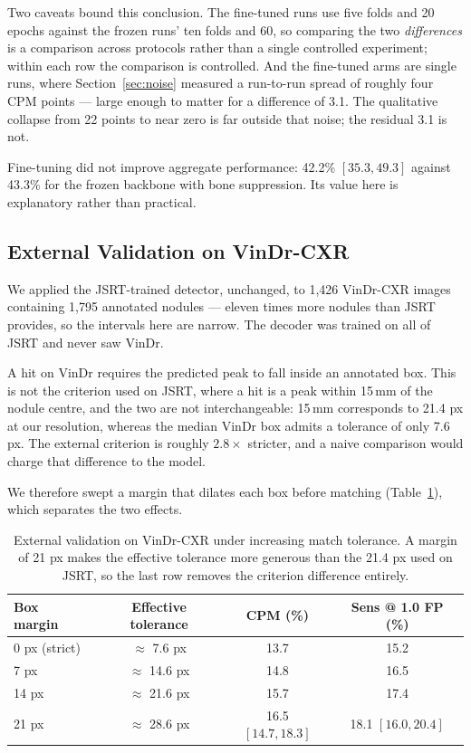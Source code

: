 \documentclass[11pt,a4paper]{article}
\begin{document}
Two caveats bound this conclusion. The fine-tuned runs use five folds and 20
epochs against the frozen runs' ten folds and 60, so comparing the two
\emph{differences} is a comparison across protocols rather than a single
controlled experiment; within each row the comparison is controlled. And the
fine-tuned arms are single runs, where Section~\ref{sec:noise} measured a
run-to-run spread of roughly four CPM points --- large enough to matter for a
difference of 3.1. The qualitative collapse from 22 points to near zero is far
outside that noise; the residual 3.1 is not.

Fine-tuning did not improve aggregate performance: 42.2\% $[35.3, 49.3]$ against
43.3\% for the frozen backbone with bone suppression. Its value here is
explanatory rather than practical.

\subsection{External Validation on VinDr-CXR}
\label{sec:external}

We applied the JSRT-trained detector, unchanged, to 1{,}426 VinDr-CXR
images~\cite{nguyen2022vindr} containing 1{,}795 annotated nodules --- eleven
times more nodules than JSRT provides, so the intervals here are narrow. The
decoder was trained on all of JSRT and never saw VinDr.

A hit on VinDr requires the predicted peak to fall inside an annotated box.
This is not the criterion used on JSRT, where a hit is a peak within 15\,mm of
the nodule centre, and the two are not interchangeable: 15\,mm corresponds to
21.4 px at our resolution, whereas the median VinDr box admits a tolerance of
only 7.6 px. The external criterion is roughly $2.8\times$ stricter, and a naive
comparison would charge that difference to the model.

We therefore swept a margin that dilates each box before matching
(Table~\ref{tab:margin}), which separates the two effects.

\begin{table}[t]
\centering
\caption{External validation on VinDr-CXR under increasing match tolerance. A
margin of 21 px makes the effective tolerance more generous than the 21.4 px
used on JSRT, so the last row removes the criterion difference entirely.}
\label{tab:margin}
\begin{tabular}{lccc}
\toprule
Box margin & Effective tolerance & CPM (\%) & Sens @ 1.0 FP (\%) \\
\midrule
0 px (strict) & $\approx$ 7.6 px  & 13.7 & 15.2 \\
7 px          & $\approx$ 14.6 px & 14.8 & 16.5 \\
14 px         & $\approx$ 21.6 px & 15.7 & 17.4 \\
21 px         & $\approx$ 28.6 px & 16.5 $[14.7, 18.3]$ & 18.1 $[16.0, 20.4]$ \\
\bottomrule
\end{tabular}
\end{table}
\end{document}
